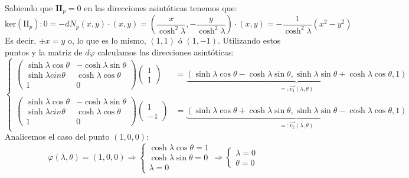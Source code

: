 Sabiendo que $\mathbf{II}_p = 0$ en las direcciones asintóticas tenemos que:
\[
\mathrm{ker} \left( \mathrm{II}_p \right): 0 = -dN_p \left( x, y \right) \cdot
\left( x, y \right) = \left( \frac{x}{\cosh^2 \lambda}, -\frac{y}{\cosh^2
\lambda} \right) \cdot \left( x, y \right) = -\frac{1}{\cosh^2 \lambda} \left(
x^2 - y^2 \right)
\]
Es decir, $\pm x = y$ o, lo que es lo mismo, $\left( 1, 1 \right)$ ó $\left( 1,
-1\right)$. Utilizando estos puntos y la matriz de $d \varphi$ calculamos las
direcciones asintóticas: 
\[
\begin{cases}
    \begin{pmatrix} 
    \sinh \lambda \cos \theta & -\cosh \lambda \sin \theta\\
    \sinh \lambda cin \theta & \cosh \lambda \cos \theta\\
    1 & 0
    \end{pmatrix} \begin{pmatrix} 1 \\ 1 \end{pmatrix} &= 
\underbrace{\left( \sinh \lambda \cos \theta - \cosh \lambda \sin \theta, \sinh \lambda
    \sin \theta + \cosh \lambda \cos \theta, 1
\right)}_{=: \overrightarrow{v_1}\left( \lambda, \theta \right)}\\

    \begin{pmatrix} 
    \sinh \lambda \cos \theta & -\cosh \lambda \sin \theta\\
    \sinh \lambda cin \theta & \cosh \lambda \cos \theta\\
    1 & 0
    \end{pmatrix} \begin{pmatrix} 1 \\ -1 \end{pmatrix} &= 
    \underbrace{\left( \sinh \lambda \cos \theta + \cosh \lambda \sin \theta, \sinh \lambda
    \sin \theta - \cosh \lambda \cos \theta, 1 \right)}_{=:
    \overrightarrow{v_2}\left( \lambda, \theta \right)}
\end{cases}
\]
Analicemos el caso del punto $\left( 1, 0, 0 \right)$:
\[
\varphi\left( \lambda, \theta \right) = \left( 1, 0, 0 \right) \Rightarrow \begin{cases}
    \cosh \lambda \cos \theta = 1\\
    \cosh \lambda \sin \theta = 0\\
    \lambda = 0
\end{cases} \Rightarrow \begin{cases}
    \lambda = 0\\
    \theta = 0
\end{cases}
\]
